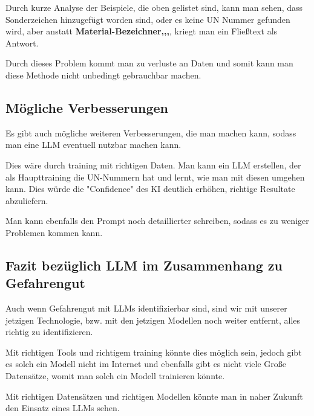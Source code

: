 Durch kurze Analyse der Beispiele, die oben gelistet sind, kann man sehen, dass
Sonderzeichen hinzugefügt worden sind, oder es keine UN Nummer gefunden wird,
aber anstatt \textbf{Material-Bezeichner,,,}, kriegt man ein Fließtext als Antwort.

Durch dieses Problem kommt man zu verluste an Daten und somit kann man diese Methode
nicht unbedingt gebrauchbar machen.

\subsection{Mögliche Verbesserungen}

Es gibt auch mögliche weiteren Verbesserungen, die man machen kann, sodass man eine
LLM eventuell nutzbar machen kann.

Dies wäre durch training mit richtigen Daten. Man kann ein LLM erstellen, der
als Haupttraining die UN-Nummern hat und lernt, wie man mit diesen umgehen kann.
Dies würde die "Confidence" des KI deutlich erhöhen, richtige Resultate abzuliefern.

Man kann ebenfalls den Prompt noch detaillierter schreiben, sodass es zu weniger
Problemen kommen kann.

\subsection{Fazit bezüglich LLM im Zusammenhang zu Gefahrengut}

Auch wenn Gefahrengut mit LLMs identifizierbar sind, sind wir mit unserer jetzigen Technologie,
bzw. mit den jetzigen Modellen noch weiter entfernt, alles richtig zu identifizieren.

Mit richtigen Tools und richtigem training könnte dies möglich sein, jedoch gibt es solch
ein Modell nicht im Internet und ebenfalls gibt es nicht viele Große Datensätze,
womit man solch ein Modell trainieren könnte.

Mit richtigen Datensätzen und richtigen Modellen könnte man in naher Zukunft den
Einsatz eines LLMs sehen.